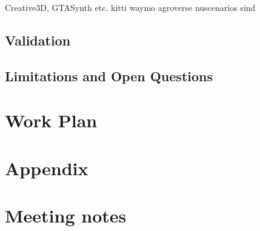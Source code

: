 \documentclass{article}
\begin{document}
Creative3D, GTASynth etc.
kitti
waymo
agroverse
nuscenarios
sind

\subsection{Validation}

\subsection{Limitations and Open Questions}


\section{Work Plan}





\section*{Appendix}

\section{Meeting notes}
\end{document}
